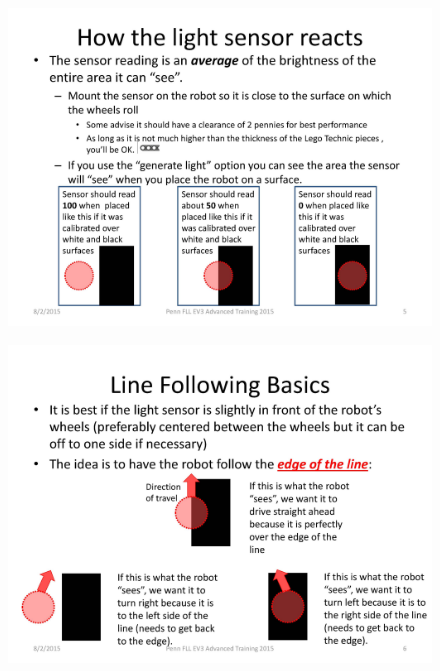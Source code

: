 \documentclass[11pt]{beamer}
\begin{document}
\begin{frame}
\begin{figure}
\includegraphics[scale=0.4]{ev3advanced2015/file-page5}
\end{figure}
\end{frame}

\begin{frame}
\begin{figure}
\includegraphics[scale=0.4]{ev3advanced2015/file-page6}
\end{figure}
\end{frame}
\end{document}
